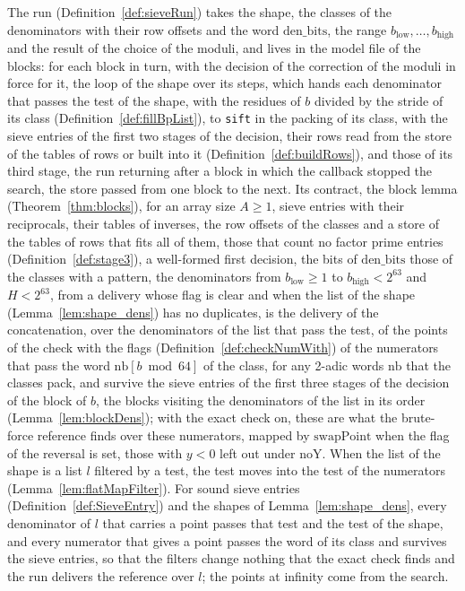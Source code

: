 The run (Definition~\ref{def:sieveRun}) takes the shape, the classes of the denominators with their
row offsets and the word $\mathrm{den\_bits}$, the range $b_{\mathrm{low}}, \dots,
b_{\mathrm{high}}$ and the result of the choice of the moduli, and lives in the model file of the
blocks: for each block in turn, with the decision of the correction of the moduli in force for it,
the loop of the shape over its steps, which hands each denominator that passes the test of the
shape, with the residues of $b$ divided by the stride of its class
(Definition~\ref{def:fillBpList}), to \verb|sift| in the packing of its class, with the sieve
entries of the first two stages of the decision, their rows read from the store of the tables of
rows or built into it (Definition~\ref{def:buildRows}), and those of its third stage, the run
returning after a block in which the callback stopped the search, the store passed from one block to
the next. Its contract, the block lemma (Theorem~\ref{thm:blocks}), for an array size $A \ge 1$,
sieve entries with their reciprocals, their tables of inverses, the row offsets of the classes and a
store of the tables of rows that fits all of them, those that count no factor prime entries
(Definition~\ref{def:stage3}), a well-formed first decision, the bits of $\mathrm{den\_bits}$ those
of the classes with a pattern, the denominators from $b_{\mathrm{low}} \ge 1$ to $b_{\mathrm{high}}
< 2^{63}$ and $H < 2^{63}$, from a delivery whose flag is clear and when the list of the shape
(Lemma~\ref{lem:shape_dens}) has no duplicates, is the delivery of the concatenation, over the
denominators of the list that pass the test, of the points of the check with the flags
(Definition~\ref{def:checkNumWith}) of the numerators that pass the word $\mathrm{nb}[b \bmod 64]$
of the class, for any 2-adic words $\mathrm{nb}$ that the classes pack, and survive the sieve
entries of the first three stages of the decision of the block of $b$, the blocks visiting the
denominators of the list in its order (Lemma~\ref{lem:blockDens}); with the exact check on, these
are what the brute-force reference finds over these numerators, mapped by $\mathrm{swapPoint}$ when
the flag of the reversal is set, those with $y < 0$ left out under $\mathrm{noY}$. When the list of
the shape is a list $l$ filtered by a test, the test moves into the test of the numerators
(Lemma~\ref{lem:flatMapFilter}). For sound sieve entries (Definition~\ref{def:SieveEntry}) and the
shapes of Lemma~\ref{lem:shape_dens}, every denominator of $l$ that carries a point passes that test
and the test of the shape, and every numerator that gives a point passes the word of its class and
survives the sieve entries, so that the filters change nothing that the exact check finds and the
run delivers the reference over $l$; the points at infinity come from the search.

